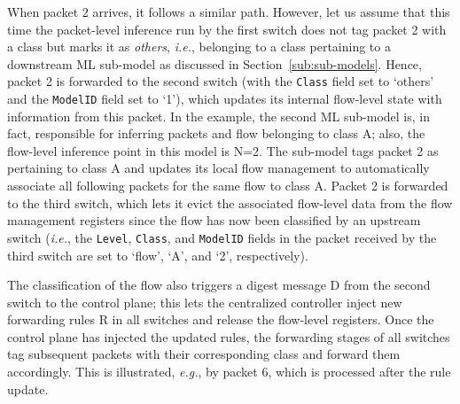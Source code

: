 \documentclass[journal]{IEEEtran}
\theoremstyle{plain} %
\newcommand{\eg}{\textit{e.g.},\xspace}
\newcommand{\ie}{\textit{i.e.},\xspace}
\newcommand{\da}[1]{\textcolor{blue}{[David: #1]}}
\newcommand{\bb}[1]{\textcolor{orange}{[Beyza: #1]}}
\newcommand{\name}{\texttt{\fontsize{9}{11}\selectfont DUNE}\xspace}
\begin{document}
When packet 2 arrives, it follows a similar path. However, let us assume that this time the packet-level inference run by the first switch does not tag packet 2 with a class but marks it as \textit{others}, \ie belonging to a class pertaining to a downstream ML sub-model as discussed in Section~\ref{sub:sub-models}.
Hence, packet 2 is forwarded to the second switch (with the \texttt{Class} field set to `others' and the \texttt{ModelID} field set to `1'), which updates its internal flow-level state with information from this packet. In the example, the second ML sub-model is, in fact, responsible for inferring packets and flow belonging to class A; also, the flow-level inference point in this model is N=2. The sub-model tags packet 2 as pertaining to class A and updates its local flow management to automatically associate all following packets for the same flow to class A.
Packet 2 is forwarded to the third switch, which lets it evict the associated flow-level data from the flow management registers since the flow has now been classified by an upstream switch (\ie the \texttt{Level}, \texttt{Class}, and \texttt{ModelID} fields in the packet received by the third switch are set to `flow', `A', and `2', respectively).

The classification of the flow also triggers a digest message D from the second switch to the control plane; this lets the centralized controller inject new forwarding rules R in all switches and release the flow-level registers. Once the control plane has injected the updated rules, the forwarding stages of all switches tag subsequent packets with their corresponding class and forward them accordingly. This is illustrated, \eg by packet 6, which is processed after the rule update.

%



\end{document}
